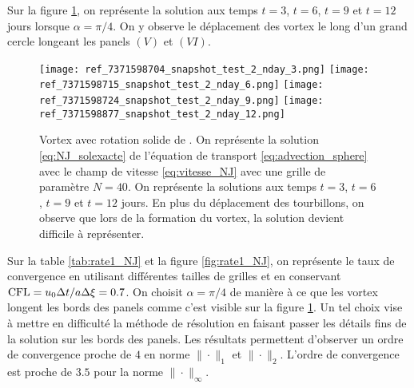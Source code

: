 Sur la figure \ref{fig:NJ_difftps}, on représente la solution aux temps $t=3$, $t=6$, $t=9$ et $t=12$ jours lorsque $\alpha = \pi/4$. On y observe le déplacement des vortex le long d'un grand cercle longeant les panels $(V)$ et $(VI)$.

\begin{figure}[htbp]
\begin{center}
\texttt{[image: ref\_7371598704\_snapshot\_test\_2\_nday\_3.png]}
\texttt{[image: ref\_7371598715\_snapshot\_test\_2\_nday\_6.png]}
\texttt{[image: ref\_7371598724\_snapshot\_test\_2\_nday\_9.png]}
\texttt{[image: ref\_7371598877\_snapshot\_test\_2\_nday\_12.png]}
\end{center}
\caption{Vortex avec rotation solide de \cite{Nair2008}. On représente la solution \eqref{eq:NJ_solexacte} de l'équation de transport \eqref{eq:advection_sphere} avec le champ de vitesse \eqref{eq:vitesse_NJ} avec une grille de paramètre $N=40$. On représente la solutions aux temps $t=3$, $t=6$, $t=9$ et $t=12$ jours. En plus du déplacement des tourbillons, on observe que lors de la formation du vortex, la solution devient difficile à représenter.}
\label{fig:NJ_difftps} 
\end{figure}

Sur la table \ref{tab:rate1_NJ} et la figure \ref{fig:rate1_NJ}, on représente le taux de convergence en utilisant différentes tailles de grilles et en conservant $\text{CFL} = u_0 \Delta t / a \Delta \xi = 0.7$. On choisit $\alpha = \pi/4$ de manière à ce que les vortex longent les bords des panels comme c'est visible sur la figure \ref{fig:NJ_difftps}. Un tel choix vise à mettre en difficulté la méthode de résolution en faisant passer les détails fins de la solution sur les bords des panels. Les résultats permettent d'observer un ordre de convergence proche de $4$ en norme $\| \cdot \|_1$ et $\| \cdot \|_2$. L'ordre de convergence est proche de $3.5$ pour la norme $\| \cdot \|_{\infty}$. 

